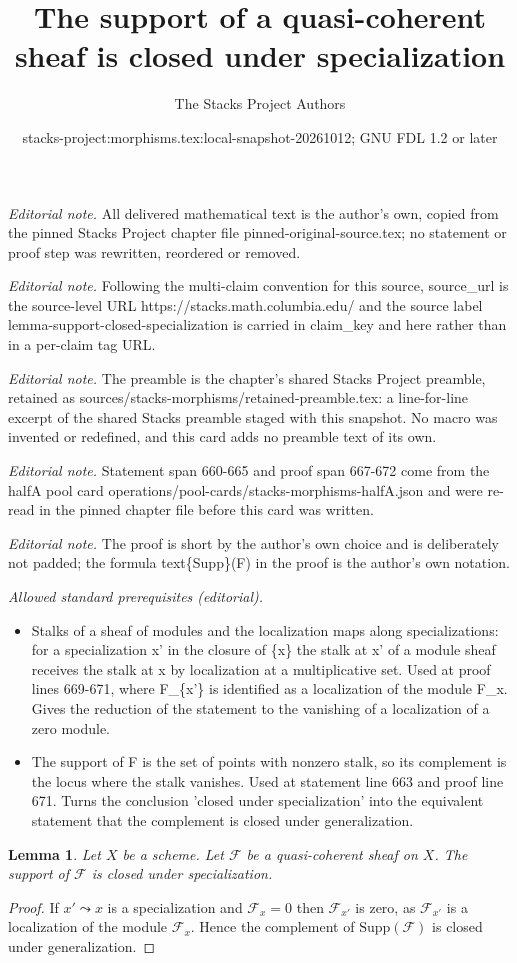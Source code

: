 \documentclass[10pt,a4paper]{amsart}
\title{The support of a quasi-coherent sheaf is closed under specialization}
\author{The Stacks Project Authors}
\date{stacks-project:morphisms.tex:local-snapshot-20261012; GNU FDL 1.2 or later}
\theoremstyle{plain}
\newtheorem{lemma}[subsection]{Lemma}
\theoremstyle{definition}
\theoremstyle{remark}
\numberwithin{equation}{subsection}
\begin{document}
\maketitle
\noindent\textit{Editorial note.} All delivered mathematical text is the author's own, copied from the pinned Stacks Project chapter file pinned-original-source.tex; no statement or proof step was rewritten, reordered or removed.\par\medskip
\noindent\textit{Editorial note.} Following the multi-claim convention for this source, source\_url is the source-level URL https://stacks.math.columbia.edu/ and the source label lemma-support-closed-specialization is carried in claim\_key and here rather than in a per-claim tag URL.\par\medskip
\noindent\textit{Editorial note.} The preamble is the chapter's shared Stacks Project preamble, retained as sources/stacks-morphisms/retained-preamble.tex: a line-for-line excerpt of the shared Stacks preamble staged with this snapshot. No macro was invented or redefined, and this card adds no preamble text of its own.\par\medskip
\noindent\textit{Editorial note.} Statement span 660-665 and proof span 667-672 come from the halfA pool card operations/pool-cards/stacks-morphisms-halfA.json and were re-read in the pinned chapter file before this card was written.\par\medskip
\noindent\textit{Editorial note.} The proof is short by the author's own choice and is deliberately not padded; the formula text\{Supp\}(F) in the proof is the author's own notation.\par\medskip
\noindent\textit{Allowed standard prerequisites (editorial).}\begin{itemize}
\item Stalks of a sheaf of modules and the localization maps along specializations: for a specialization x' in the closure of \{x\} the stalk at x' of a module sheaf receives the stalk at x by localization at a multiplicative set. Used at proof lines 669-671, where F\_\{x'\} is identified as a localization of the module F\_x. Gives the reduction of the statement to the vanishing of a localization of a zero module.
\item The support of F is the set of points with nonzero stalk, so its complement is the locus where the stalk vanishes. Used at statement line 663 and proof line 671. Turns the conclusion 'closed under specialization' into the equivalent statement that the complement is closed under generalization.
\end{itemize}\medskip
\begin{lemma}
\label{lemma-support-closed-specialization}
Let $X$ be a scheme.
Let $\mathcal{F}$ be a quasi-coherent sheaf on $X$.
The support of $\mathcal{F}$ is closed under specialization.
\end{lemma}

\begin{proof}
If $x' \leadsto x$ is a specialization and $\mathcal{F}_x = 0$
then $\mathcal{F}_{x'}$ is zero, as $\mathcal{F}_{x'}$ is a localization
of the module $\mathcal{F}_x$. Hence the complement of
$\text{Supp}(\mathcal{F})$ is closed under generalization.
\end{proof}
\end{document}
